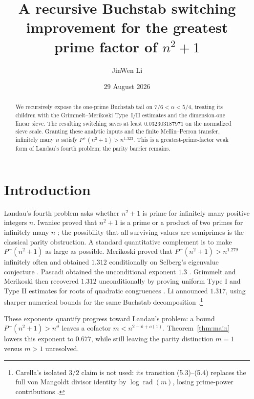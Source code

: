 \documentclass[10pt,reqno]{amsart}
\title[Recursive Buchstab switching]{A recursive Buchstab switching improvement for the greatest prime factor of $n^2+1$}
\author{JinWen Li}
\date{29 August 2026}
\newcommand{\Pplus}{P^{+}}
\newcommand{\1}{\mathbf{1}}
\theoremstyle{plain}
\theoremstyle{remark}
\begin{document}
\raggedbottom

\begin{abstract}
We recursively expose the one-prime Buchstab tail on
$7/6<\alpha<5/4$, treating its children with the Grimmelt--Merikoski
Type~I/II estimates and the dimension-one linear sieve.  The resulting
switching saves at least $0.032303187971$ on the normalized sieve scale.
Granting these analytic inputs and the finite Mellin--Perron transfer,
infinitely many $n$ satisfy $\Pplus(n^2+1)>n^{1.323}$.  This is a
greatest-prime-factor weak form of Landau's fourth problem; the parity
barrier remains.
\end{abstract}

\maketitle

\section{Introduction}

Landau's fourth problem asks whether $n^2+1$ is prime for infinitely many
positive integers $n$.  Iwaniec proved that $n^2+1$ is a prime or a product
of two primes for infinitely many $n$ \cite{Iwaniec1978}; the possibility
that all surviving values are semiprimes is the classical parity
obstruction.  A standard quantitative complement is to make
$\Pplus(n^2+1)$ as large as possible.  Merikoski proved that
$\Pplus(n^2+1)>n^{1.279}$ infinitely often and obtained $1.312$ conditionally
on Selberg's eigenvalue conjecture \cite{Merikoski2020}.  Pascadi obtained the
unconditional exponent $1.3$ \cite{Pascadi2026}.  Grimmelt and Merikoski then
recovered $1.312$ unconditionally by proving uniform Type I and Type II
estimates for roots of quadratic congruences
\cite{GrimmeltMerikoski2025}.  Li announced $1.317$, using sharper numerical
bounds for the same Buchstab decomposition \cite{Li2025}.\footnote{Carella's
isolated $3/2$ claim is not used: its transition (5.3)--(5.4) replaces the
full von Mangoldt divisor identity by $\log\operatorname{rad}(m)$, losing
prime-power contributions \cite[Section 5]{Carella2025}.}

These exponents quantify progress toward Landau's problem: a bound
$\Pplus(n^2+1)>n^\vartheta$ leaves a cofactor
$m<n^{2-\vartheta+o(1)}$.  Theorem~\ref{thm:main} lowers this exponent to
$0.677$, while still leaving the parity distinction $m=1$ versus
$m>1$ unresolved.
\end{document}
